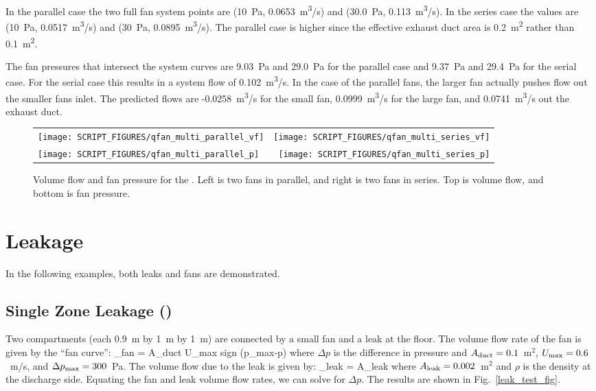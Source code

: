 \documentclass[11pt]{book}
\begin{document}
In the parallel case the two full fan system points are (10~Pa, 0.0653~\si{m^3/s}) and (30.0~Pa, 0.113~\si{m^3/s}). In the series case the values are (10~Pa, 0.0517~\si{m^3/s}) and (30~Pa, 0.0895~\si{m^3/s}). The parallel case is higher since the effective exhaust duct area is 0.2~\si{m^2} rather than 0.1~\si{m^2}.

The fan pressures that intersect the system curves are 9.03~Pa and 29.0~Pa for the parallel case and 9.37~Pa and 29.4~Pa for the serial case. For the serial case this results in a system flow of 0.102~\si{m^3/s}. In the case of the parallel fans, the larger fan actually pushes flow out the smaller fans inlet. The predicted flows are -0.0258~\si{m^3/s} for the small fan, 0.0999~\si{m^3/s} for the large fan, and 0.0741~\si{m^3/s} out the exhaust duct.

\begin{figure}[ht]
    \begin{tabular*}{\textwidth}{lr}
        \texttt{[image: SCRIPT\_FIGURES/qfan\_multi\_parallel\_vf]} &
        \texttt{[image: SCRIPT\_FIGURES/qfan\_multi\_series\_vf]} \\
        \texttt{[image: SCRIPT\_FIGURES/qfan\_multi\_parallel\_p]} &
        \texttt{[image: SCRIPT\_FIGURES/qfan\_multi\_series\_p]}
    \end{tabular*}
    \caption[Results of the  case]{Volume flow and fan pressure for the . Left is two fans in parallel, and right is two fans in series. Top is volume flow, and bottom is fan pressure.}
    \label{qfan_multi_fig}
\end{figure}

\section{Leakage}

In the following examples, both leaks and fans are demonstrated.

\subsection{Single Zone Leakage (\texorpdfstring{}{leak\_test})}
\label{single_zone_leak}
\label{leak_test}

Two compartments (each 0.9~m by 1~m by 1~m) are connected by a small fan and a leak at the floor. The volume flow rate of the fan is given by the ``fan curve'':
\be
  _{\hbox{\footnotesize fan}} = A_{\hbox{\footnotesize duct}}
  U_{\hbox{\footnotesize max}} \;
   \hbox{sign} (\Delta p_{\hbox{\footnotesize max}}-\Delta p)
\ee
where $\Delta p$ is the difference in pressure and $A_{\hbox{\scriptsize duct}}=0.1$~m$^2$, $U_{\hbox{\scriptsize max}}=0.6$~m/s, and $\Delta p_{\hbox{\scriptsize max}}=300$~Pa. The volume flow due to the leak is given by:
\be
   _{\hbox{\scriptsize leak}} = A_{\hbox{\scriptsize leak}} 
\ee
where $A_{\hbox{\scriptsize leak}}=0.002$~m$^2$ and $\rho$ is the density at the discharge side. Equating the fan and leak volume flow rates, we can solve for $\Delta p$. The results are shown in Fig.~\ref{leak_test_fig}.
\end{document}
